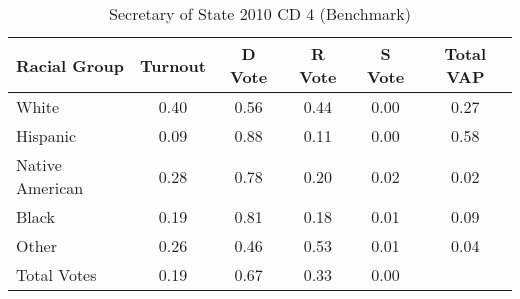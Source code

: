 \begin{table}[htb]
\begin{center}
\caption{Secretary of State 2010 CD 4 (Benchmark)}
\label{sos10_vap_cd_4_benchmark}
\begin{tabular}{lccccc}
  \hline
Racial Group & Turnout & D Vote & R Vote & S Vote & Total VAP \\ 
  \hline
White & 0.40 & 0.56 & 0.44 & 0.00 & 0.27 \\ 
  Hispanic & 0.09 & 0.88 & 0.11 & 0.00 & 0.58 \\ 
  Native American & 0.28 & 0.78 & 0.20 & 0.02 & 0.02 \\ 
  Black & 0.19 & 0.81 & 0.18 & 0.01 & 0.09 \\ 
  Other & 0.26 & 0.46 & 0.53 & 0.01 & 0.04 \\ 
  Total Votes & 0.19 & 0.67 & 0.33 & 0.00 &  \\ 
   \hline
\end{tabular}
\end{center}
\end{table}
